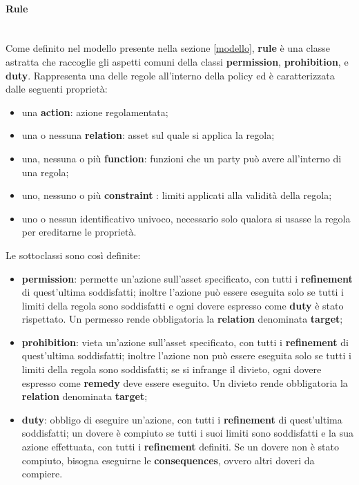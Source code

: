 \documentclass[12pt,a4paper,twoside]{book}
\begin{document}
\paragraph{Rule}\label{ODRLRulePara}\mbox{}\\
Come definito nel modello presente nella sezione \ref{modello}, \textbf{rule} è una classe astratta che raccoglie gli aspetti comuni della classi  \textbf{permission}, \textbf{prohibition}, e \textbf{duty}. Rappresenta una delle regole all'interno della policy ed è caratterizzata dalle seguenti proprietà:
\begin{itemize}
	\item una \textbf{action}: azione regolamentata;
	\item una o nessuna \textbf{relation}: asset sul quale si applica la regola;
	\item una, nessuna o più \textbf{function}: funzioni che un party può avere all'interno di una regola;
	\item uno, nessuno o più \textbf{constraint }: limiti applicati alla validità della regola;
	\item uno o nessun identificativo univoco, necessario solo qualora si usasse la regola per ereditarne le proprietà.
\end{itemize}
Le sottoclassi sono così definite:
\begin{itemize}
	\item \textbf{permission}: permette un'azione sull'asset specificato, con tutti i \textbf{refinement} di quest'ultima soddisfatti; inoltre l'azione può essere eseguita solo se tutti i limiti della regola sono soddisfatti e ogni dovere espresso come \textbf{duty} è stato rispettato. Un permesso rende obbligatoria la \textbf{relation} denominata \textbf{target};
	\item \textbf{prohibition}: vieta un'azione sull'asset specificato, con tutti i \textbf{refinement} di quest'ultima soddisfatti; inoltre l'azione non può essere eseguita solo se tutti i limiti della regola sono soddisfatti; se si infrange il divieto, ogni dovere espresso come \textbf{remedy} deve essere eseguito. Un divieto rende obbligatoria la \textbf{relation} denominata \textbf{target};
	\item \textbf{duty}: obbligo di eseguire un'azione, con tutti i \textbf{refinement} di quest'ultima soddisfatti; un dovere è compiuto se tutti i suoi limiti sono soddisfatti e la sua azione effettuata, con tutti i \textbf{refinement} definiti. Se un dovere non è stato compiuto, bisogna eseguirne le \textbf{consequences}, ovvero altri doveri da compiere.
\end{itemize}
\end{document}
